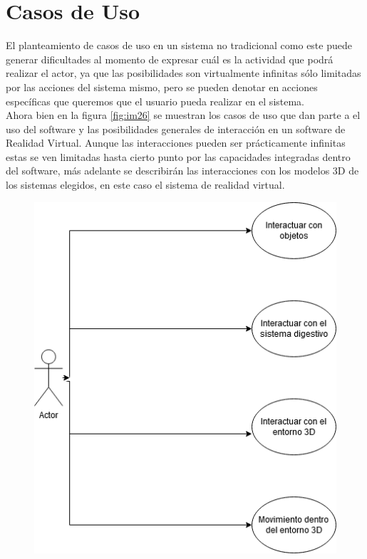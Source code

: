 \section{Casos de Uso}
El planteamiento de casos de uso en un sistema no tradicional como este puede generar dificultades al momento de expresar cuál es la actividad que podrá realizar el actor, ya que las posibilidades son virtualmente infinitas sólo limitadas por las acciones del sistema mismo,  pero se pueden denotar en acciones específicas que queremos que el usuario pueda realizar en el sistema.\\
Ahora bien en la figura \ref{fig:im26} se muestran los casos de uso que dan parte a el uso del software y las posibilidades generales de interacción en un software de Realidad Virtual. Aunque las interacciones pueden ser prácticamente infinitas estas se ven limitadas hasta cierto punto por las capacidades integradas dentro del software, más adelante se describirán las interacciones con los modelos 3D de los sistemas elegidos, en este caso el sistema de realidad virtual.\\
\begin{figure}[H]
	\begin{center}
 		\includegraphics[width = .35\textwidth]{source/images/image36.png}
	\end{center} 
\end{figure}

